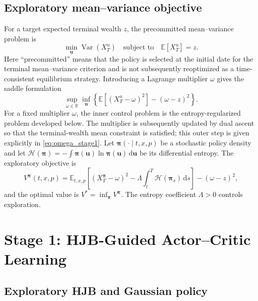 \documentclass[a4paper,10pt]{article}
\newcommand{\E}{\mathbb{E}}
\newcommand{\R}{\mathbb{R}}
\newcommand{\dd}{\mathrm{d}}
\newcommand{\bpi}{\bm{\pi}}
\newcommand{\bu}{\bm{u}}
\newcommand{\cH}{\mathcal{H}}
\begin{document}
\subsection{Exploratory mean--variance objective}

For a target expected terminal wealth $z$, the precommitted mean--variance problem is
\begin{equation}
\min_{\bu}\operatorname{Var}(X_T^u)
\quad\text{subject to}\quad \E[X_T^u]=z.
\end{equation}
Here ``precommitted'' means that the policy is selected at the initial date for the terminal mean--variance criterion and is not subsequently reoptimized as a time-consistent equilibrium strategy.
Introducing a Lagrange multiplier $\omega$ gives the saddle formulation
\begin{equation}
\sup_{\omega\in\R}\inf_{\bu}\left\{
\E[(X_T^u-\omega)^2]-(\omega-z)^2
\right\}.
\label{eq:mv_lagrange}
\end{equation}
For a fixed multiplier $\omega$, the inner control problem is the entropy-regularized problem developed below. The multiplier is subsequently updated by dual ascent so that the terminal-wealth mean constraint is satisfied; this outer step is given explicitly in \eqref{eq:omega_stage1}.
Let $\bpi(\cdot\mid t,x,p)$ be a stochastic policy density and let
\(
\cH(\bpi)=-\int\bpi(\bu)\ln\bpi(\bu)\,\dd\bu
\)
be its differential entropy. The exploratory objective is
\begin{equation}
V^{\bpi}(t,x,p)
=\E_{t,x,p}\left[(X_T^{\bpi}-\omega)^2
-\Lambda\int_t^T\cH(\bpi_s)\,\dd s\right]
-(\omega-z)^2,
\label{eq:exploratory_value}
\end{equation}
and the optimal value is $V^*=\inf_{\bpi}V^{\bpi}$. The entropy coefficient $\Lambda>0$ controls exploration.

\section{Stage 1: HJB-Guided Actor--Critic Learning}

\subsection{Exploratory HJB and Gaussian policy}
\end{document}
